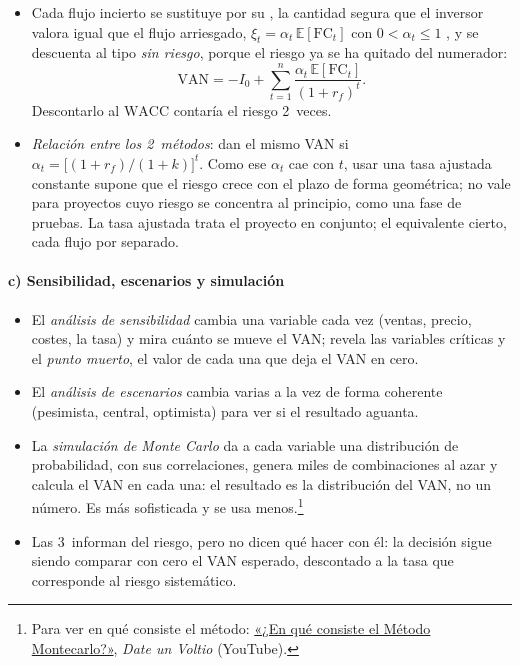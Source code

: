 \documentclass[11pt]{article}
\begin{document}
\begin{itemize}
\item Cada flujo incierto se sustituye por su , la cantidad segura que el inversor valora igual que el flujo arriesgado, $\xi_t=\alpha_t\,\mathbb{E}[\mathrm{FC}_t]$ con $0<\alpha_t\leq1$ , y se descuenta al tipo \emph{sin riesgo}, porque el riesgo ya se ha quitado del numerador:
  \[
  \mathrm{VAN}=-I_0+\sum_{t=1}^{n}\frac{\alpha_t\,\mathbb{E}[\mathrm{FC}_t]}{(1+r_f)^t}.
  \]
  Descontarlo al $\mathrm{WACC}$ contaría el riesgo 2~veces.
\item \emph{Relación entre los 2~métodos}: dan el mismo VAN si $\alpha_t=\big[(1+r_f)/(1+k)\big]^t$. Como ese $\alpha_t$ cae con $t$, usar una tasa ajustada constante supone que el riesgo crece con el plazo de forma geométrica; no vale para proyectos cuyo riesgo se concentra al principio, como una fase de pruebas\nocite{BrealeyMyersAllen2020Principles}. La tasa ajustada trata el proyecto en conjunto; el equivalente cierto, cada flujo por separado.
\end{itemize}

\paragraph{c) Sensibilidad, escenarios y simulación}

\begin{itemize}
\item El \emph{análisis de sensibilidad} cambia una variable cada vez (ventas, precio, costes, la tasa) y mira cuánto se mueve el VAN; revela las variables críticas y el \emph{punto muerto}, el valor de cada una que deja el VAN en cero.
\item El \emph{análisis de escenarios} cambia varias a la vez de forma coherente (pesimista, central, optimista) para ver si el resultado aguanta.
\item La \emph{simulación de Monte Carlo}\nocite{Hertz1964Risk} da a cada variable una distribución de probabilidad, con sus correlaciones, genera miles de combinaciones al azar y calcula el VAN en cada una: el resultado es la distribución del VAN, no un número. Es más sofisticada y se usa menos.\footnote{Para ver en qué consiste el método: \href{https://www.youtube.com/watch?v=WJjDr67frtM}{«¿En qué consiste el Método Montecarlo?»}, \emph{Date un Voltio} (YouTube).}
\item Las 3~informan del riesgo, pero no dicen qué hacer con él: la decisión sigue siendo comparar con cero el VAN esperado, descontado a la tasa que corresponde al riesgo sistemático.
\end{itemize}
\end{document}
